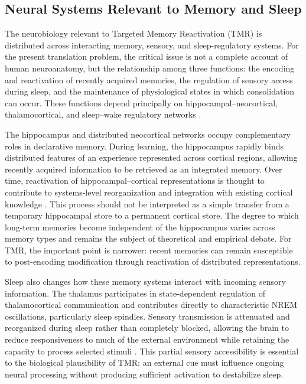 \subsection{Neural Systems Relevant to Memory and Sleep}

The neurobiology relevant to Targeted Memory Reactivation (TMR) is distributed
across interacting memory, sensory, and sleep-regulatory systems. For the present
translation problem, the critical issue is not a complete account of human
neuroanatomy, but the relationship among three functions: the encoding and
reactivation of recently acquired memories, the regulation of sensory access
during sleep, and the maintenance of physiological states in which consolidation
can occur. These functions depend principally on hippocampal--neocortical,
thalamocortical, and sleep--wake regulatory networks
\citep{squire2015consolidation,scammell2017sleep}.

The hippocampus and distributed neocortical networks occupy complementary roles
in declarative memory. During learning, the hippocampus rapidly binds distributed
features of an experience represented across cortical regions, allowing recently
acquired information to be retrieved as an integrated memory. Over time,
reactivation of hippocampal--cortical representations is thought to contribute
to systems-level reorganization and integration with existing cortical knowledge
\citep{squire2015consolidation,dudai2015consolidation}. This process should not
be interpreted as a simple transfer from a temporary hippocampal store to a
permanent cortical store. The degree to which long-term memories become
independent of the hippocampus varies across memory types and remains the subject
of theoretical and empirical debate. For TMR, the important point is narrower:
recent memories can remain susceptible to post-encoding modification through
reactivation of distributed representations.

Sleep also changes how these memory systems interact with incoming sensory
information. The thalamus participates in state-dependent regulation of
thalamocortical communication and contributes directly to characteristic NREM
oscillations, particularly sleep spindles. Sensory transmission is attenuated
and reorganized during sleep rather than completely blocked, allowing the brain
to reduce responsiveness to much of the external environment while retaining
the capacity to process selected stimuli
\citep{scammell2017sleep,fernandez2020spindles}. This partial sensory
accessibility is essential to the biological plausibility of TMR: an external
cue must influence ongoing neural processing without producing sufficient
activation to destabilize sleep.

